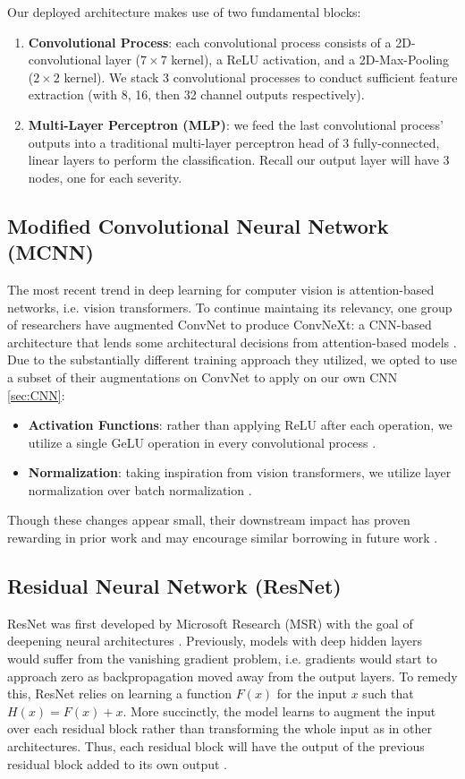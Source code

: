\documentclass[conference]{IEEEtran}
\begin{document}
Our deployed architecture makes use of two fundamental blocks:
\begin{enumerate}
    \item \textbf{Convolutional Process}: each convolutional process
    consists of a 2D-convolutional layer ($7 \times 7$ kernel), a ReLU activation, and a 2D-Max-Pooling ($2 \times 2$ kernel). We stack 3 convolutional processes to conduct sufficient feature extraction (with 8, 16, then 32 channel outputs respectively).
    
    \item \textbf{Multi-Layer Perceptron (MLP)}: we feed the last convolutional process' outputs into a traditional multi-layer perceptron head of 3 fully-connected, linear layers to perform the classification. Recall our output layer will have 3 nodes, one for each severity.
\end{enumerate}

\subsection{Modified Convolutional Neural Network (MCNN)}
The most recent trend in deep learning for computer vision is attention-based networks, i.e. vision transformers. To continue maintaing its relevancy, one group of researchers have augmented ConvNet to produce ConvNeXt: a CNN-based architecture that lends some architectural decisions from attention-based models \cite{convnet}. Due to the substantially different training approach they utilized, we opted to use a subset of their augmentations on ConvNet to apply on our own CNN \ref{sec:CNN}:
\begin{itemize}
    \item \textbf{Activation Functions}: rather than applying ReLU after each operation, we utilize a single GeLU operation in every convolutional process \cite{convnet}.
    
    \item \textbf{Normalization}: taking inspiration from vision transformers, we utilize layer normalization over batch normalization \cite{convnet}.
\end{itemize}

Though these changes appear small, their downstream impact has proven rewarding in prior work and may encourage similar borrowing in future work \cite{convnet}.

\subsection{Residual Neural Network (ResNet)}
ResNet was first developed by Microsoft Research (MSR) with the goal of deepening neural architectures \cite{resnet}. Previously, models with deep hidden layers would suffer from the vanishing gradient problem, i.e. gradients would start to approach zero as backpropagation moved away from the output layers. To remedy this, ResNet relies on learning a function $F(x)$ for the input $x$ such that $H(x) = F(x) + x$. More succinctly, the model learns to augment the input over each residual block rather than transforming the whole input as in other architectures. Thus, each residual block will have the output of the previous residual block added to its own output \cite{resnet}.
\end{document}
